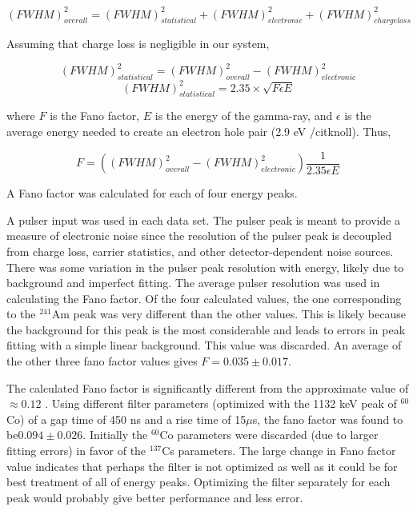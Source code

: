 \begin{equation}
(FWHM)^{2}_{overall} = (FWHM)^{2}_{statistical}+ (FWHM)^{2}_{electronic} + (FWHM)^{2}_{chargeloss}
\end{equation}
\vspace{5mm}

Assuming that charge loss is negligible in our system,

\vspace{5mm}
\begin{equation}
(FWHM)^{2}_{statistical} = (FWHM)^{2}_{overall} - (FWHM)^{2}_{electronic}
\end{equation}
\begin{equation}
(FWHM)^{2}_{statistical} = 2.35 \times \sqrt{F \epsilon E}
\end{equation}
\vspace{5mm}

where $F$ is the Fano factor, $E$ is the energy of the gamma-ray, and $\epsilon$ is the average energy needed to create an 
electron hole pair (2.9 eV /cit{knoll}). Thus,

\vspace{5mm}
\begin{equation}
F = ((FWHM)^{2}_{overall} - (FWHM)^{2}_{electronic}) \frac{1}{2.35 \epsilon E}
\end{equation}
\vspace{5mm}

A Fano factor was calculated for each of four energy peaks.
  
A pulser input was used in each data set. The pulser peak is meant to provide a measure of electronic noise since the resolution of the pulser peak is decoupled from charge loss, carrier statistics, and other detector-dependent noise sources. There was some variation in the pulser peak resolution with energy, likely due to background and imperfect fitting. The average pulser resolution was used in calculating the Fano factor. Of the four calculated values, the one corresponding to the ${}^{241}$Am peak was very different than the other values. This is likely because the background for this peak is the most considerable and leads to errors in peak fitting with a simple linear background. This value was discarded. An average of the other three fano factor values gives $F = 0.035 \pm0.017$.

The calculated Fano factor is significantly different from the approximate value of $\approx 0.12$ \cite{Knoll}. Using different filter parameters (optimized with the 1132 keV peak of ${}^{60}$Co) of a gap time of 450 ns and a rise time of 15$\mu$s, the fano factor was found to be$ 0.094 \pm 0.026$. Initially the ${}^{60}$Co parameters were discarded (due to larger fitting errors) in favor of the $^{137}$Cs parameters. The large change in Fano factor value indicates that perhaps the filter is not optimized as well as it could be for best treatment of all of energy peaks. Optimizing the filter separately for each peak would probably give better performance and less error.